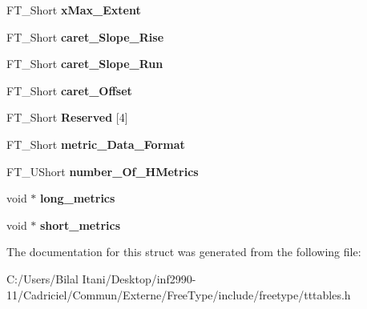 \begin{DoxyCompactItemize}
\item 
F\+T\+\_\+\+Short {\bfseries x\+Max\+\_\+\+Extent}\hypertarget{struct_t_t___hori_header___ab483cb323f9adc9d959209a42eb19957}{}\label{struct_t_t___hori_header___ab483cb323f9adc9d959209a42eb19957}

\item 
F\+T\+\_\+\+Short {\bfseries caret\+\_\+\+Slope\+\_\+\+Rise}\hypertarget{struct_t_t___hori_header___aeb43d92f56de424d8f28bd389973eca4}{}\label{struct_t_t___hori_header___aeb43d92f56de424d8f28bd389973eca4}

\item 
F\+T\+\_\+\+Short {\bfseries caret\+\_\+\+Slope\+\_\+\+Run}\hypertarget{struct_t_t___hori_header___acce162ae0554006c11a3383bd3454d69}{}\label{struct_t_t___hori_header___acce162ae0554006c11a3383bd3454d69}

\item 
F\+T\+\_\+\+Short {\bfseries caret\+\_\+\+Offset}\hypertarget{struct_t_t___hori_header___a791ad767d54cc87e84d9b03d6739f0eb}{}\label{struct_t_t___hori_header___a791ad767d54cc87e84d9b03d6739f0eb}

\item 
F\+T\+\_\+\+Short {\bfseries Reserved} \mbox{[}4\mbox{]}\hypertarget{struct_t_t___hori_header___af2a2b374d8f81771fb75d3bdc96bcbf7}{}\label{struct_t_t___hori_header___af2a2b374d8f81771fb75d3bdc96bcbf7}

\item 
F\+T\+\_\+\+Short {\bfseries metric\+\_\+\+Data\+\_\+\+Format}\hypertarget{struct_t_t___hori_header___a0ed857e9629d2dfb5350a6b5976bf933}{}\label{struct_t_t___hori_header___a0ed857e9629d2dfb5350a6b5976bf933}

\item 
F\+T\+\_\+\+U\+Short {\bfseries number\+\_\+\+Of\+\_\+\+H\+Metrics}\hypertarget{struct_t_t___hori_header___aac3ecb9ba7c13436a663b91765e89647}{}\label{struct_t_t___hori_header___aac3ecb9ba7c13436a663b91765e89647}

\item 
void $\ast$ {\bfseries long\+\_\+metrics}\hypertarget{struct_t_t___hori_header___a3eeb5766b461e9563b659a30e775fcc2}{}\label{struct_t_t___hori_header___a3eeb5766b461e9563b659a30e775fcc2}

\item 
void $\ast$ {\bfseries short\+\_\+metrics}\hypertarget{struct_t_t___hori_header___ae39107c4cfc3e7c1871dbb304bbe4a5a}{}\label{struct_t_t___hori_header___ae39107c4cfc3e7c1871dbb304bbe4a5a}

\end{DoxyCompactItemize}


The documentation for this struct was generated from the following file\+:\begin{DoxyCompactItemize}
\item 
C\+:/\+Users/\+Bilal Itani/\+Desktop/inf2990-\/11/\+Cadriciel/\+Commun/\+Externe/\+Free\+Type/include/freetype/tttables.\+h\end{DoxyCompactItemize}
